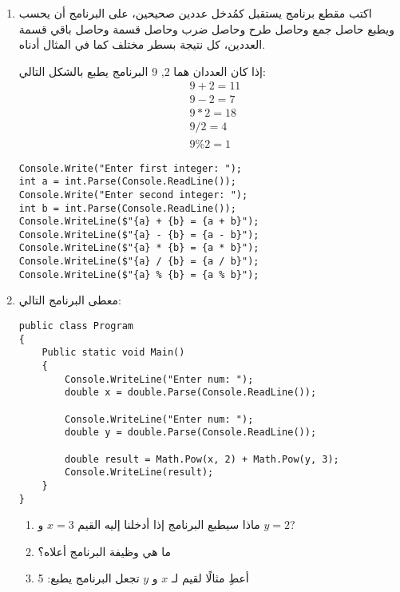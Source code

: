 \documentclass[12pt]{article}
\begin{document}
\begin{enumerate}[itemsep=2em]
\clearpage
\item
	اكتب مقطع برنامج يستقبل كمُدخل عددين صحيحين، على البرنامج أن يحسب ويطبع حاصل جمع وحاصل طرح وحاصل ضرب وحاصل قسمة وحاصل باقي قسمة العددين، كل نتيجة بسطر مختلف كما في المثال أدناه.
\begin{boxExample}
    إذا كان العددان هما 2, 9 البرنامج يطبع بالشكل التالي:
    \begin{align*}
        &9 + 2 = 11 \\
        &9 - 2 = 7 \\
        &9 * 2 = 18 \\
        &9 / 2 = 4 \\
        &9 \% 2 = 1
    \end{align*}
\end{boxExample}

\ifwithsols
\begin{boxSolution}
\begin{english}
\begin{verbatim}
Console.Write("Enter first integer: ");
int a = int.Parse(Console.ReadLine());
Console.Write("Enter second integer: ");
int b = int.Parse(Console.ReadLine());
Console.WriteLine($"{a} + {b} = {a + b}");
Console.WriteLine($"{a} - {b} = {a - b}");
Console.WriteLine($"{a} * {b} = {a * b}");
Console.WriteLine($"{a} / {b} = {a / b}");
Console.WriteLine($"{a} % {b} = {a % b}");
\end{verbatim}
\end{english}
\end{boxSolution}
\clearpage
\fi

\item
	معطى البرنامج التالي:
\begin{english}
\begin{verbatim}
public class Program
{
    Public static void Main()
    {
        Console.WriteLine("Enter num: ");
        double x = double.Parse(Console.ReadLine());

        Console.WriteLine("Enter num: ");
        double y = double.Parse(Console.ReadLine());

        double result = Math.Pow(x, 2) + Math.Pow(y, 3);
        Console.WriteLine(result);
    }
}
\end{verbatim}
\end{english}
\begin{enumerate}
    \item ماذا سيطبع البرنامج إذا أدخلنا إليه القيم \(x = 3\) و \(y = 2\)?
    \item ما هي وظيفة البرنامج أعلاه؟
    \item أعطِ مثالًا لقيم لـ $x$ و $y$ تجعل البرنامج يطبع: 5
\end{enumerate}


\end{enumerate}
\end{document}
